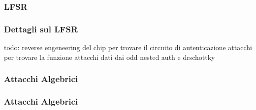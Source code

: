 \subsubsection{LFSR}
\begin{frame}
    \frametitle{Dettagli sul LFSR}
    todo: 
        reverse engeneering \cite{nohl2008reverse} del chip per trovare il circuito di autenticazione
        attacchi per trovare la funzione \cite{garcia2008dismantling}
        attacchi dati dai odd
        nested auth e drschottky
\end{frame}

\subsubsection{Attacchi Algebrici}
\begin{frame}
    \frametitle{Attacchi Algebrici}

\end{frame}

